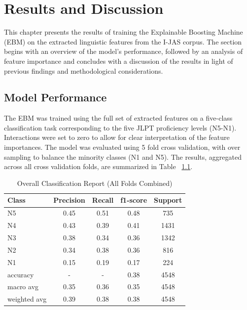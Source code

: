 \chapter{Results and Discussion}
This chapter presents the results of training the Explainable Boosting Machine (EBM) on the extracted linguistic
features from the I-JAS corpus. The section begins with an overview of the model's performance, followed by an
analysis of feature importance and concludes with a discussion of the results in light of previous findings and
methodological considerations.


\section{Model Performance}

The EBM was trained using the full set of extracted features on a five-class classification task corresponding to
the five JLPT proficiency levels (N5-N1). Interactions were set to zero to allow for clear interpretation of the
feature importances. The model was
evaluated using 5 fold cross validation,
with over sampling to balance the minority classes (N1 and N5). The results, aggregated across all cross validation
folds, are summarized
in Table~
\ref{tab:trainingResults}.


\begin{table}[h!]
    \centering
    \begin{tabular}{lcccc}
        \hline \textbf{Class} & \textbf{Precision} & \textbf{Recall} & \textbf{f1-score} & \textbf{Support} \\ \hline
        N5    &   0.45   &   0.51   &   0.48   &    735\\
          N4    &   0.43   &   0.39   &   0.41   &   1431\\
          N3    &   0.38   &   0.34   &   0.36  &    1342\\
          N2  &     0.34   &   0.38  &    0.36   &    816\\
          N1    &   0.15   &   0.19   &   0.17    &   224\\ \hline
        accuracy &   -    &      -    &     0.38  &    4548\\
   macro avg  &     0.35   &   0.36  &    0.35   &   4548\\
weighted avg  &     0.39  &    0.38    &  0.38   &   4548\\ \hline
    \end{tabular}
    \caption[Overall Classification Report (All Folds Combined)]{Overall Classification Report (All Folds Combined)}
    \label{tab:trainingResults}
\end{table}

